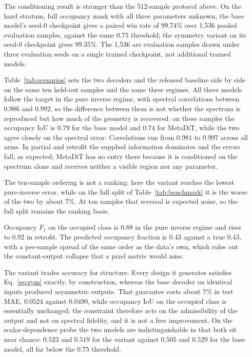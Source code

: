 \documentclass[pdflatex,oneside,sn-mathphys-num]{sn-jnl}
\theoremstyle{thmstyleone}
\theoremstyle{thmstyletwo}
\theoremstyle{thmstylethree}
\begin{document}
The conditioning result is stronger than the 512-sample protocol above. On the hard
stratum, full occupancy mask with all three parameters unknown, the base model's seed-0
checkpoint gives a paired win rate of $99.74\%$ over 1{,}536 pooled evaluation samples,
against the same $0.75$ threshold; the symmetry variant on its seed-0 checkpoint gives
$99.35\%$. The 1{,}536 are evaluation samples drawn under three evaluation seeds on a
single trained checkpoint, not additional trained models.

Table~\ref{tab:scenarios} sets the two decoders and the released baseline side by side on
the same ten held-out samples and the same three regimes. All three models follow the target
in the pure inverse regime, with spectral correlations between $0.986$ and $0.992$, so the
difference between them is not whether the spectrum is reproduced but how much of the
geometry is recovered: on these samples the occupancy IoU is $0.79$ for the base model and
$0.74$ for MetaDiT, while the two agree closely on the spectral error. Correlations run from
$0.981$ to $0.997$ across all arms. In partial and retrofit
the supplied information dominates and the errors fall, as expected; MetaDiT has no entry
there because it is conditioned on the spectrum alone and receives neither a visible region
nor any parameter.

The ten-sample ordering is not a ranking: here the variant reaches the lowest pure-inverse
error, while on the full split of Table~\ref{tab:benchmark} it is the worse of the two by
about $7\%$. At ten samples that reversal is expected noise, so the full split remains the
ranking basis.

Occupancy $F_1$ on the occupied class is $0.88$ in the pure inverse regime and rises to
$0.92$ in retrofit. The predicted occupancy fraction is $0.43$ against a true $0.43$,
with a per-sample spread of the same order as the data's own, which rules out the
constant-output collapse that a pixel metric would miss.

The variant trades accuracy for structure. Every design it generates satisfies
Eq.~\eqref{eq:sym} exactly, by construction, whereas the base decoder on identical inputs
produced asymmetric outputs. That guarantee costs about $7\%$ in test MAE, $0.0524$ against
$0.0490$, while occupancy IoU on the occupied class is essentially unchanged; the constraint
therefore acts on the admissibility of the output and not on spectral fidelity, and it is not
a free improvement. On the scalar-dependence probe the two models are indistinguishable in
that both sit near chance: $0.523$ and $0.519$ for the variant against $0.505$ and $0.529$ for
the base model, all far below the $0.75$ threshold.
\end{document}
